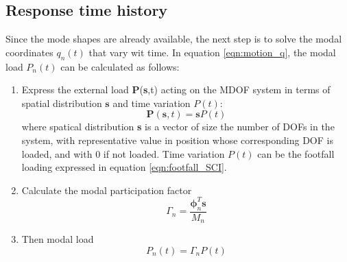 \subsection{Response time history}
\label{subsec:resp_time_histroy}
Since the mode shapes are already available, the next step is to solve the modal coordinates $q_n(t)$ that vary wit time. In equation \ref{eqn:motion_q}, the modal load $P_n(t)$ can be calculated as follows:
\begin{enumerate}
    \item 
     Express the external load $\textbf{P}$(\textbf{s},t) acting on the MDOF system in terms of spatial distribution $\mathbf{s}$ and time variation $P(t)$: 
    \begin{equation}
    \mathbf{P}(\mathbf{s},t)=\mathbf{s}P(t)
    \end{equation}
    \noindent
    where spatical distribution \textbf{s} is a vector of size the number of DOFs in the system, with representative value in position whose corresponding DOF is loaded, and with 0 if not loaded. Time variation $P(t)$ can be the footfall loading expressed in equation \ref{eqn:footfall_SCI}. 

    \item
    Calculate the modal participation factor 
    \begin{equation}
    \label{eqn:Gamma}
    \Gamma_n=\frac{\boldsymbol{\phi}_n^T\mathbf{s}}{M_n}
    \end{equation}
    
    \item
    Then modal load
    \begin{equation}
    P_n(t)=\Gamma_nP(t)
    \end{equation}
\end{enumerate}


